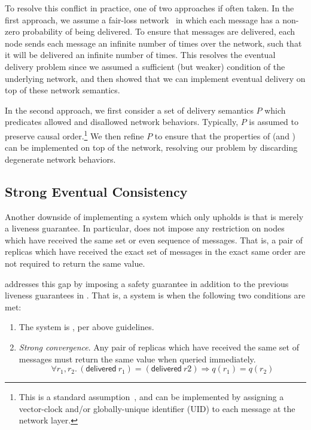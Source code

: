 To resolve this conflict in practice, one of two approaches if often taken. In
the first approach, we assume a fair-loss network~\citep{cachin11} in which each
message has a non-zero probability of being delivered. To ensure that messages
are delivered, each node sends each message an infinite number of times over the
network, such that it will be delivered an infinite number of times. This
resolves the eventual delivery problem since we assumed a sufficient (but
weaker) condition of the underlying network, and then showed that we can
implement eventual delivery on top of these network semantics.

In the second approach, we first consider a set of delivery semantics $P$ which
predicates allowed and disallowed network behaviors. Typically, $P$ is assumed
to preserve causal order.\footnote{This is a standard
assumption~\citep{shapiro11,gomes17}, and can be implemented by assigning a
vector-clock and/or globally-unique identifier (UID) to each message at the
network layer.} We then refine $P$ to ensure that the properties of \EC (and
\SEC) can be implemented on top of the network, resolving our problem by
discarding degenerate network behaviors.

\subsection{Strong Eventual Consistency}
Another downside of implementing a system which only upholds \EC is that \EC is
merely a liveness guarantee. In particular, \EC does not impose any restriction
on nodes which have received the same set or even sequence of messages. That is,
a pair of replicas which have received the exact set of messages in the exact
same order are not required to return the same value.

\SEC addresses this gap by imposing a safety guarantee in addition to the
previous liveness guarantees in \EC. That is, a system is \SEC when the
following two conditions are met:
\begin{enumerate}
  \item The system is \EC, per above guidelines.
  \item \emph{Strong convergence}. Any pair of replicas which have received the
    same set of messages must return the same value when queried immediately.
    \[
      \forall r_1, r_2.\, (\textsf{delivered}~r_1) = (\textsf{delivered}~r2)
        \Rightarrow q(r_1) = q(r_2)
    \]
\end{enumerate}

